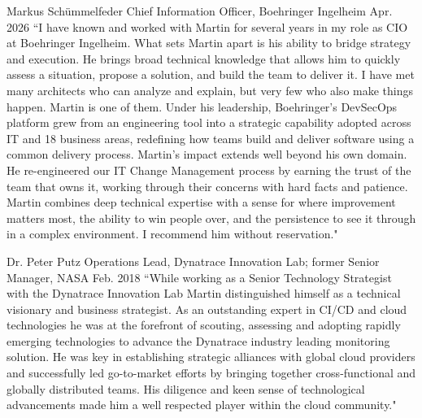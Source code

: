 \begin{cventries}
  \cvrecommendation
    {Markus Schümmelfeder}
    {Chief Information Officer, Boehringer Ingelheim}
    {Apr. 2026}
    {
      ``I have known and worked with Martin for several years in my role as CIO at Boehringer Ingelheim. What sets Martin apart is his ability to bridge strategy and execution. He brings broad technical knowledge that allows him to quickly assess a situation, propose a solution, and build the team to deliver it. I have met many architects who can analyze and explain, but very few who also make things happen. Martin is one of them. Under his leadership, Boehringer's DevSecOps platform grew from an engineering tool into a strategic capability adopted across IT and 18 business areas, redefining how teams build and deliver software using a common delivery process. Martin's impact extends well beyond his own domain. He re-engineered our IT Change Management process by earning the trust of the team that owns it, working through their concerns with hard facts and patience. Martin combines deep technical expertise with a sense for where improvement matters most, the ability to win people over, and the persistence to see it through in a complex environment. I recommend him without reservation."
    }

    \vspace{1.0mm}

  \cvrecommendation
    {Dr. Peter Putz}
    {Operations Lead, Dynatrace Innovation Lab; former Senior Manager, NASA}
    {Feb. 2018}
    {
      ``While working as a Senior Technology Strategist with the Dynatrace Innovation Lab Martin distinguished himself as a technical visionary and business strategist. As an outstanding expert in CI/CD and cloud technologies he was at the forefront of scouting, assessing and adopting rapidly emerging technologies to advance the Dynatrace industry leading monitoring solution. He was key in establishing strategic alliances with global cloud providers and successfully led go-to-market efforts by bringing together cross-functional and globally distributed teams. His diligence and keen sense of technological advancements made him a well respected player within the cloud community."
    }

    \vspace{1.0mm}

\end{cventries}
